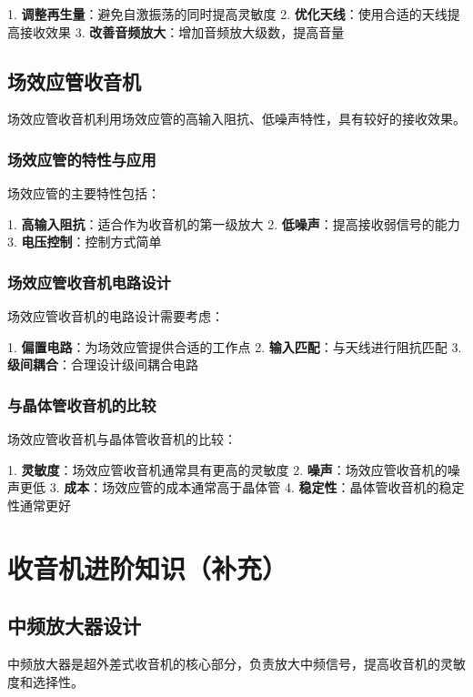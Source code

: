 \documentclass[12pt,UTF8]{ctexbook}
\begin{document}
1. \textbf{调整再生量}：避免自激振荡的同时提高灵敏度
2. \textbf{优化天线}：使用合适的天线提高接收效果
3. \textbf{改善音频放大}：增加音频放大级数，提高音量

\chapter{场效应管收音机}

场效应管收音机利用场效应管的高输入阻抗、低噪声特性，具有较好的接收效果。

\section{场效应管的特性与应用}

场效应管的主要特性包括：

1. \textbf{高输入阻抗}：适合作为收音机的第一级放大
2. \textbf{低噪声}：提高接收弱信号的能力
3. \textbf{电压控制}：控制方式简单

\section{场效应管收音机电路设计}

场效应管收音机的电路设计需要考虑：

1. \textbf{偏置电路}：为场效应管提供合适的工作点
2. \textbf{输入匹配}：与天线进行阻抗匹配
3. \textbf{级间耦合}：合理设计级间耦合电路

\section{与晶体管收音机的比较}

场效应管收音机与晶体管收音机的比较：

1. \textbf{灵敏度}：场效应管收音机通常具有更高的灵敏度
2. \textbf{噪声}：场效应管收音机的噪声更低
3. \textbf{成本}：场效应管的成本通常高于晶体管
4. \textbf{稳定性}：晶体管收音机的稳定性通常更好

\part{收音机进阶知识（补充）}

\chapter{中频放大器设计}

中频放大器是超外差式收音机的核心部分，负责放大中频信号，提高收音机的灵敏度和选择性。
\end{document}
